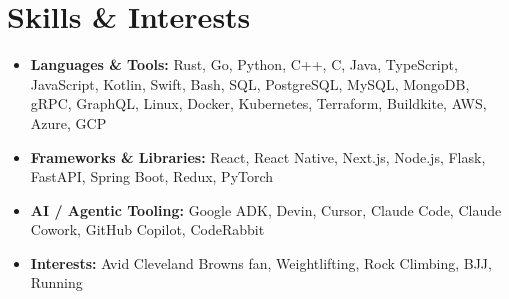 \documentclass[letterpaper,11pt]{article}
\newcommand{\resumeItem}[1]{
  \item\small{
    {#1 \vspace{-2pt}}
  }
}
\newcommand{\resumeSubItem}[1]{\resumeItem{#1}\vspace{-4pt}}
\newcommand{\resumeSubHeadingListStart}{\begin{itemize}[leftmargin=0.15in, label={}]}
\newcommand{\resumeSubHeadingListEnd}{\end{itemize}}
\begin{document}
\section{Skills \& Interests}
\resumeSubHeadingListStart
  \resumeSubItem{\textbf{Languages \& Tools:} Rust, Go, Python, C++, C, Java, TypeScript, JavaScript, Kotlin, Swift, Bash, SQL, PostgreSQL, MySQL, MongoDB, gRPC, GraphQL, Linux, Docker, Kubernetes, Terraform, Buildkite, AWS, Azure, GCP}
  \resumeSubItem{\textbf{Frameworks \& Libraries:} React, React Native, Next.js, Node.js, Flask, FastAPI, Spring Boot, Redux, PyTorch}
  \resumeSubItem{\textbf{AI / Agentic Tooling:} Google ADK, Devin, Cursor, Claude Code, Claude Cowork, GitHub Copilot, CodeRabbit}
  \resumeSubItem{\textbf{Interests:} Avid Cleveland Browns fan, Weightlifting, Rock Climbing, BJJ, Running}
\resumeSubHeadingListEnd
\end{document}

